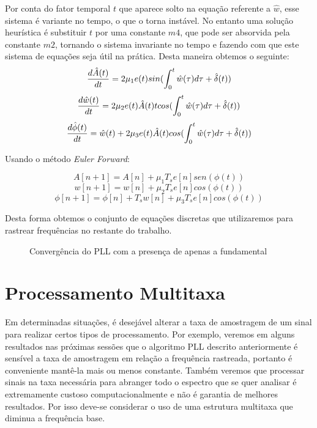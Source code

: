 \documentclass[a4paper, 12pt]{book}
\begin{document}
Por conta do fator temporal $t$ que aparece solto na equação referente a $\hat{w}$, esse sistema é variante no tempo, o que o torna instável. No entanto uma solução heurística é substituir $t$ por uma constante $m4$, que pode ser absorvida pela constante $m2$, tornando o sistema invariante no tempo e fazendo com que este sistema de equações seja útil na prática. Desta maneira obtemos o seguinte:
\begin{equation}
\frac{d\hat{A}(t)}{dt}=2\mu_1e(t)sin(\int_{0}^{t}\hat{w}(\tau)d\tau\space+\space\hat{\delta}(t))
\end{equation}
\begin{equation}
\frac{d\hat{w}(t)}{dt}=2\mu_2e(t)\hat{A}(t)tcos(\int_{0}^{t}\hat{w}(\tau)d\tau\space+\space\hat{\delta}(t))
\end{equation}
\begin{equation}
\frac{d\hat{\phi}(t)}{dt}=\hat{w}(t)+2\mu_3e(t)\hat{A}(t)cos(\int_{0}^{t}\hat{w}(\tau)d\tau\space+\space\hat{\delta}(t))
\end{equation}

Usando o método \textit{Euler Forward}:

\begin{equation}
A[n+1]=A[n]+\mu_1T_s e[n]sen(\phi(t))
\end{equation}
\begin{equation}
w[n+1]=w[n]+\mu_2T_s e[n]cos(\phi(t))
\end{equation}
\begin{equation}
\phi[n+1]=\phi[n] + T_s w[n] + \mu_3T_s e[n]cos(\phi(t))
\end{equation}

Desta forma obtemos o conjunto de equações discretas que utilizaremos para rastrear frequências no restante do trabalho.

\begin{figure}[h]
	\centering    
	\def\svgwidth{\columnwidth}
	
	\caption{Convergência do PLL com a presença de apenas a fundamental}
	\label{fig:your image label}
\end{figure}


\section{Processamento Multitaxa}

Em determinadas situações, é desejável alterar a taxa de amostragem de um sinal para realizar certos tipos de processamento. Por exemplo, veremos em alguns resultados nas próximas sessões que o algoritmo PLL descrito anteriormente é sensível a taxa de amostragem em relação a frequência rastreada, portanto é conveniente mantê-la mais ou menos constante. Também veremos que processar sinais na taxa necessária para abranger todo o espectro que se quer analisar é extremamente custoso computacionalmente e não é garantia de melhores resultados. Por isso deve-se considerar o uso de uma estrutura multitaxa que diminua a frequência base.
\end{document}
